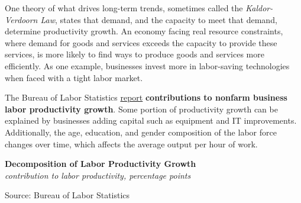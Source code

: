 \documentclass{report}
\makeatletter
\newcommand{\tbllink}[1]{\href{https://raw.githubusercontent.com/bdecon/US-chartbook/master/chartbook/data/#1}{\faTable}}
\newcommand*\short[1]{\expandafter\@gobbletwo\number\numexpr#1\relax}
\newcommand{\ctsbar}[5]{
		\addplot[ybar stacked, bar width=#5, draw opacity=0, fill=#1] 
			table [x=#2, y=#3, col sep=comma]{#4};}
\newcommand{\dateaxisticks}{
		date coordinates in=x, axis line style={draw=none},
		xmax={2023-10-01},
		max space between ticks=40,	    
		xtick={{1990-01-01}, {1992-01-01}, {1994-01-01}, 
			{1996-01-01}, {1998-01-01}, {2000-01-01}, 
			{2002-01-01}, {2004-01-01}, {2006-01-01},
			{2008-01-01}, {2010-01-01}, {2012-01-01}, {2014-01-01},
		    {2016-01-01}, {2018-01-01}, {2020-01-01}, {2022-01-01}, 
		    {2024-01-01}, {2026-01-01}},
		minor xtick={{1989-01-01}, {1991-01-01}, {1993-01-01},
			{1995-01-01}, {1997-01-01}, {1999-01-01}, 
			{2001-01-01}, {2003-01-01}, {2005-01-01}, {2007-01-01},
		    {2009-01-01}, {2011-01-01}, {2013-01-01}, {2015-01-01},
		    {2017-01-01}, {2019-01-01}, {2021-01-01}, {2023-01-01}, 
		    {2025-01-01}, {2027-01-01}},
		enlarge y limits={0.06}, enlarge x limits={0.01},
		}
\newcommand{\bbar}[2]{extra #1 ticks = {{#2}}, extra #1 tick labels = ,
		extra #1 tick style = {grid=major, grid style={thick, black!25}},}
\newcommand{\rbars}{
		\fill[color=black!10] (axis cs:{1990-07-01},\pgfkeysvalueof{/pgfplots/ymin}) rectangle 
			(axis cs:{1991-03-01}, \pgfkeysvalueof{/pgfplots/ymax});
		\fill[color=black!10] (axis cs:{2007-12-01},\pgfkeysvalueof{/pgfplots/ymin}) rectangle 
			(axis cs:{2009-07-01}, \pgfkeysvalueof{/pgfplots/ymax});
		\fill[color=black!10] (axis cs:{2001-03-01},\pgfkeysvalueof{/pgfplots/ymin}) rectangle 
			(axis cs:{2001-11-01}, \pgfkeysvalueof{/pgfplots/ymax});
		\fill[color=black!10] (axis cs:{2020-02-01},\pgfkeysvalueof{/pgfplots/ymin}) rectangle 
			(axis cs:{2020-05-01}, \pgfkeysvalueof{/pgfplots/ymax});}
\makeatother
\begin{document}
{\begin{minipage}{0.76\textwidth}
One theory of what drives long-term trends, sometimes called the \textit{Kaldor-Verdoorn Law}, states that demand, and the capacity to meet that demand, determine productivity growth. An economy facing real resource constraints, where demand for goods and services exceeds the capacity to provide these services, is more likely to find ways to produce goods and services more efficiently. As one example, businesses invest more in labor-saving technologies when faced with a tight labor market. 
\end{minipage}
\newpage
\begin{minipage}{0.76\textwidth} 
\small The Bureau of Labor Statistics \href{https://www.bls.gov/news.release/prod3.nr0.htm}{report} \textbf{contributions to nonfarm business labor productivity growth}. Some portion of productivity growth can be explained by businesses adding capital such as equipment and IT improvements. Additionally, the age, education, and gender composition of the labor force changes over time, which affects the average output per hour of work. 


\vspace{2mm}

\normalsize \textbf{Decomposition of Labor Productivity Growth}\\
\footnotesize{\textit{contribution to labor productivity, percentage points}}
\vspace{3.4cm}

\hspace*{4mm} 

\footnotesize{Source: Bureau of Labor Statistics} \hfill \tbllink{tfp.csv} 
\end{minipage}
\newpage
\begin{minipage}{0.76\textwidth}

\end{minipage}}
\end{document}

